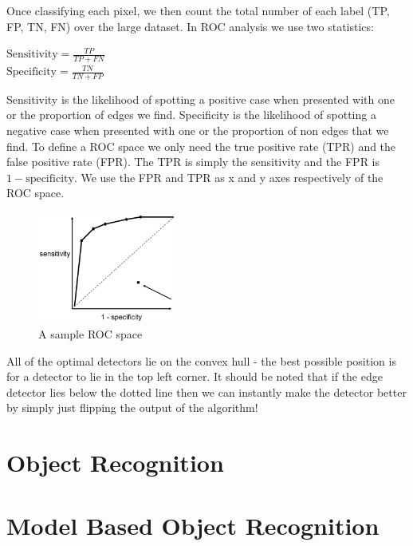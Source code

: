 \documentclass{article}
\begin{document}
Once classifying each pixel, we then count the total number of each label (TP, FP, TN, FN) over the large dataset. In ROC analysis we use two statistics:
	\begin{multicols}{2}
		\noindent
		\centering
			$ \text{Sensitivity} = \frac{TP}{TP+FN}$ \\
			$ \text{Specificity} = \frac{TN}{TN+FP}$
	\end{multicols}	
	Sensitivity is the likelihood of spotting a positive case when presented with one or the proportion of edges we find. Specificity is the likelihood of spotting a negative case when presented with one or the proportion of non edges that we find. To define a ROC space we only need the true positive rate (TPR) and the false positive rate (FPR). The TPR is simply the sensitivity and the FPR is $1 - \text{specificity}$. We use the FPR and TPR as x and y axes respectively of the ROC space.
	
	\begin{figure}
		\centering
		\includegraphics[width=0.4\textwidth]{roc_analysis}
		\caption{A sample ROC space}
		\label{fig:roc_analysis}
	\end{figure}
	
	All of the optimal detectors lie on the convex hull - the best possible position is for a detector to lie in the top left corner. It should be noted that if the edge detector lies below the dotted line then we can instantly make the detector better by simply just flipping the output of the algorithm!
		
	\section{Object Recognition}

	\section{Model Based Object Recognition}
	\newpage
	\listoffigures
	\printindex
\end{document}
